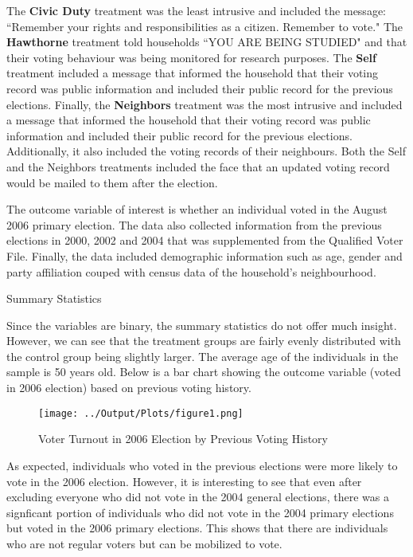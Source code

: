 \documentclass[11pt]{article}
\begin{document}
The \textbf{Civic Duty} treatment was the least intrusive and included the message: ``Remember your rights and responsibilities as a citizen. Remember to vote." The \textbf{Hawthorne} treatment told households ``YOU ARE BEING STUDIED" and that their voting behaviour was being monitored for research purposes. The \textbf{Self} treatment included a message that informed the household that their voting record was public information and included their public record for the previous elections. Finally, the \textbf{Neighbors} treatment was the most intrusive and included a message that informed the household that their voting record was public information and included their public record for the previous elections. Additionally, it also included the voting records of their neighbours.
Both the Self and the Neighbors treatments included the face that an updated voting record would be mailed to them after the election.

The outcome variable of interest is whether an individual voted in the August 2006 primary election. The data also collected information from the previous elections in 2000, 2002 and 2004 that was supplemented from the Qualified Voter File. Finally, the data included demographic information such as age, gender and party affiliation couped with census data of the household's neighbourhood.

\begin{table}[H]
    \centering
    \caption{Summary Statistics}
    \label{tab:summary_stats}

    \begin{adjustbox}{width=\textwidth, center}
        
    \end{adjustbox}
\end{table}

Since the variables are binary, the summary statistics do not offer much insight. However, we can see that the treatment groups are fairly evenly distributed with the control group being slightly larger. The average age of the individuals in the sample is 50 years old. Below is a bar chart showing the outcome variable (voted in 2006 election) based on previous voting history.
\begin{figure}[H]
    \centering
    \texttt{[image: ../Output/Plots/figure1.png]}   
    \caption{Voter Turnout in 2006 Election by Previous Voting History}
    \label{fig:figure1}
\end{figure}

As expected, individuals who voted in the previous elections were more likely to vote in the 2006 election. However, it is interesting to see that even after excluding everyone who did not vote in the 2004 general elections, there was a signficant portion of individuals who did not vote in the 2004 primary elections but voted in the 2006 primary elections. This shows that there are individuals who are not regular voters but can be mobilized to vote. 
\end{document}
